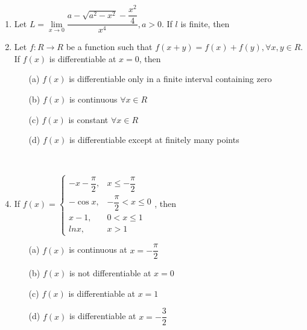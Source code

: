 \begin{enumerate}[label=\arabic*.,ref=\thesubsection.\theenumi]
\item Let $L=\lim\limits_{x \to 0}\dfrac{a-\sqrt{a^2-x^2}-\dfrac{x^2}{4}}{x^4}, a>0$. If $l$ is finite, then
\begin{itemize}
\end{itemize}

\item Let $f:R\to R$ be a function such that $f(x+y)=f(x)+f(y), \forall x, y\in R$. If $f(x)$ is differentiable at $x=0$, then
\begin{itemize}
\item[(a)] $f(x)$ is differentiable only in a finite interval containing zero
\item[(b)] $f(x)$ is continuous $\forall x \in R$
\item[(c)] $f(x)$ is constant $\forall x \in R$
\item[(d)] $f(x)$ is differentiable except at finitely many points 
\end{itemize} 

\item[~]\item If $f(x)=\begin{cases}
-x-\dfrac{\pi}{2}, & \text{$x\leq -\dfrac{\pi}{2}$}\\
-\cos x, & \text{$-\dfrac{\pi}{2}<x\leq 0$}\\
x-1, & \text{$0<x\leq 1$}\\
lnx, & \text{$x>1$}
\end{cases}$, then
\begin{itemize}
\item[(a)] $f(x)$ is continuous at $x=-\dfrac{\pi}{2}$
\item[(b)] $f(x)$ is not differentiable at $x=0$
\item[(c)] $f(x)$ is differentiable at $x=1$
\item[(d)] $f(x)$ is differentiable at $x=-\dfrac{3}{2}$
\end{itemize}


\end{enumerate}
